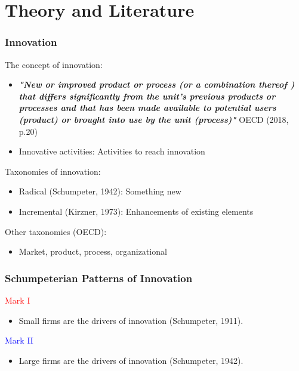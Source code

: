\documentclass{beamer}
\begin{document}
\section{Theory and Literature}
	\begin{frame}[allowframebreaks]
		\frametitle{Innovation}
		The concept of innovation:
		\begin{itemize}
			\item \textbf{\textit{"New or improved product or process (or a combination thereof ) that differs
			significantly from the unit's previous products or processes and that has been made available to potential users (product) or brought into use by the unit (process)"}} OECD (2018, p.20)
			\item Innovative activities: Activities to reach innovation
		\end{itemize}
		\framebreak
		Taxonomies of innovation:
		\begin{itemize}
			\item Radical (Schumpeter, 1942): Something new
			\item Incremental (Kirzner, 1973): Enhancements of existing elements
		\end{itemize}
		Other taxonomies (OECD):
		\begin{itemize}
			\item Market, product, process, organizational
		\end{itemize}
	\end{frame}
	\begin{frame}
		\frametitle{Schumpeterian Patterns of Innovation}
		\textcolor{red}{Mark I}
		\begin{itemize}
			\item Small firms are the drivers of innovation (Schumpeter, 1911).
		\end{itemize}
		\textcolor{blue}{Mark II}
		\begin{itemize}
			\item Large firms are the drivers of innovation (Schumpeter, 1942).
		\end{itemize}
	\end{frame}
\end{document}
